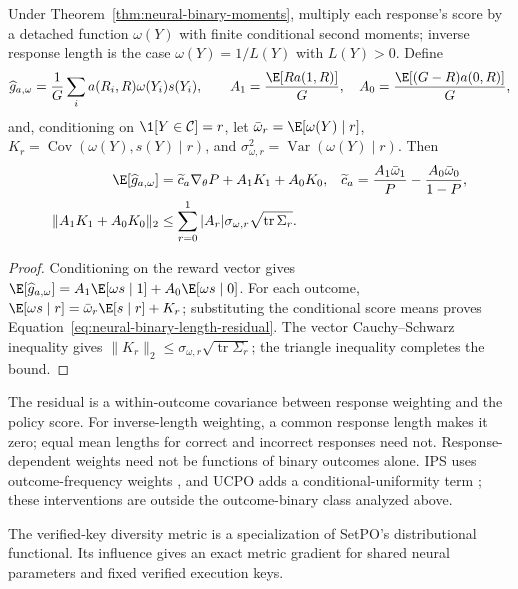 \begin{proposition}
\enforcehalffinalproseline
\label{prop:neural-binary-length-residual}
Under Theorem~\ref{thm:neural-binary-moments}, multiply each response's score
by a detached function $\omega(Y)$ with finite conditional second moments;
inverse response length is the case $\omega(Y)=1/L(Y)$ with $L(Y)>0$. Define
\[
 \widehat g_{a,\omega}
 =\frac1G\sum_i a(R_i,R)\omega(Y_i)s(Y_i),\qquad
 A_1=\frac{\E[R a(1,R)]}{G},\quad
 A_0=\frac{\E[(G-R)a(0,R)]}{G},
\]
and, conditioning on $\1[Y\in\mathcal C]=r$, let
$\bar\omega_r=\E[\omega(Y)\mid r]$,
$K_r=\operatorname{Cov}(\omega(Y),s(Y)\mid r)$, and
$\sigma_{\omega,r}^2=\operatorname{Var}(\omega(Y)\mid r)$.
Then
\begin{align}
 \E[\widehat g_{a,\omega}]
 &=\widetilde c_a\nabla_\theta P+A_1K_1+A_0K_0,
 &\widetilde c_a&=\frac{A_1\bar\omega_1}{P}
                  -\frac{A_0\bar\omega_0}{1-P},
 \label{eq:neural-binary-length-residual}\\
 \|A_1K_1+A_0K_0\|_2
 &\le\sum_{r=0}^1|A_r|\sigma_{\omega,r}
                 \sqrt{\operatorname{tr}\Sigma_r}.
 \label{eq:neural-binary-length-bound}
\end{align}
\end{proposition}

\begin{proof}
\enforcehalffinalproseline
Conditioning on the reward vector gives
$\E[\widehat g_{a,\omega}]
=A_1\E[\omega s\mid1]+A_0\E[\omega s\mid0]$.
For each outcome, $\E[\omega s\mid r]
=\bar\omega_r\E[s\mid r]+K_r$; substituting the conditional score
means proves Equation~\eqref{eq:neural-binary-length-residual}.
The vector Cauchy--Schwarz inequality gives
$\|K_r\|_2\le\sigma_{\omega,r}\sqrt{\operatorname{tr}\Sigma_r}$;
the triangle inequality completes the bound.
\end{proof}

The residual is a within-outcome covariance between response weighting and
the policy score. For inverse-length weighting, a common response length
makes it zero; equal mean lengths for correct and incorrect responses need
not. Response-dependent weights need not be functions of binary outcomes
alone. IPS uses outcome-frequency weights
\citep[Section~4.4, v1]{sinha2026expected}, and UCPO adds a
conditional-uniformity term \citep[Section~6, v1]{lochab2026ucpo}; these
interventions are outside the outcome-binary class analyzed above.

The verified-key diversity metric is a specialization of SetPO's
distributional functional. Its influence gives an exact metric gradient
for shared neural parameters and fixed verified execution keys.

